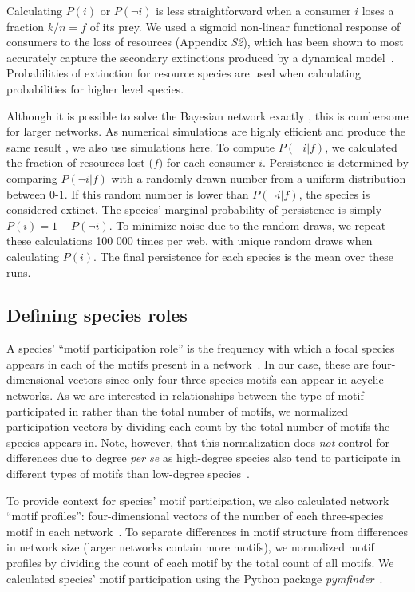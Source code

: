 \documentclass[12pt]{article}
\begin{document}
\begin{spacing}{2.0}
		Calculating $P(i)$ or $P(\lnot i)$ is less straightforward when a consumer $i$ loses a fraction $k/n = f$ of its prey. 
		We used a sigmoid non-linear functional response of consumers to the loss of resources (Appendix \emph{S2}), which has been shown to most accurately capture the secondary extinctions produced by a dynamical model~\citep{Eklof2013}. 
		Probabilities of extinction for resource species are used when calculating probabilities for higher level species. 


		Although it is possible to solve the Bayesian network exactly \citep{Eklof2013}, this is cumbersome for larger networks. 
		As numerical simulations are highly efficient and produce the same result \citep{Haussler2020}, we also use simulations here.
		To compute $P(\lnot i|f)$, we calculated the fraction of resources lost ($f$) for each consumer $i$.
		Persistence is determined by comparing $P(\lnot i|f)$ with a randomly drawn number from a uniform distribution between 0-1. 
		If this random number is lower than $P(\lnot i|f)$, the species is considered extinct. 
		The species' marginal probability of persistence is simply $P(i) = 1-P(\lnot i)$.
		To minimize noise due to the random draws, we repeat these calculations 100 000 times per web, with unique random draws when calculating $P(i)$.
		The final persistence for each species is the mean over these runs. 
		

	\subsection*{Defining species roles}

        A species' ``motif participation role'' is the frequency with which a focal species appears in each of the motifs present in a network~\citep{Stouffer2012}.
        In our case, these are four-dimensional vectors since only four three-species motifs can appear in acyclic networks.
        As we are interested in relationships between the type of motif participated in rather than the total number of motifs, we normalized participation vectors by dividing each count by the total number of motifs the species appears in.
        Note, however, that this normalization does \emph{not} control for differences due to degree \emph{per se} as high-degree species also tend to participate in different types of motifs than low-degree species~\citep{Cirtwill2021_inprep}.
        
        
        To provide context for species' motif participation, we also calculated network ``motif profiles'': four-dimensional vectors of the number of each three-species motif in each network~\citep{Stouffer2012}.
        To separate differences in motif structure from differences in network size (larger networks contain more motifs), we normalized motif profiles by dividing the count of each motif by the total count of all motifs. 
		We calculated species' motif participation using the Python package \emph{pymfinder}~\citep{pymfinder}.



\end{spacing}
\end{document}
